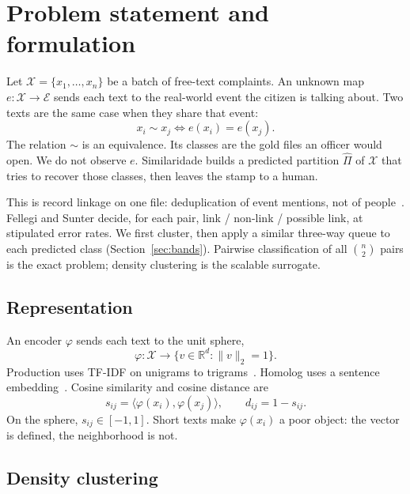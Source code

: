 \documentclass[acmlarge,screen]{acmart}
\begin{document}
\section{Problem statement and formulation}

Let \(\mathcal{X}=\{x_1,\ldots,x_n\}\) be a batch of free-text complaints. An unknown map \(e:\mathcal{X}\to\mathcal{E}\) sends each text to the real-world event the citizen is talking about. Two texts are the same case when they share that event:
\begin{equation}
  x_i \sim x_j \iff e(x_i)=e(x_j).
  \label{eq:same}
\end{equation}
The relation \(\sim\) is an equivalence. Its classes are the gold files an officer would open. We do not observe \(e\). Similaridade builds a predicted partition \(\widehat{\Pi}\) of \(\mathcal{X}\) that tries to recover those classes, then leaves the stamp to a human.

This is record linkage on one file: deduplication of event mentions, not of people~\cite{fellegi1969linkage,elmagarmid2007duplicate}. Fellegi and Sunter decide, for each pair, link / non-link / possible link, at stipulated error rates. We first cluster, then apply a similar three-way queue to each predicted class (Section~\ref{sec:bands}). Pairwise classification of all \(\binom{n}{2}\) pairs is the exact problem; density clustering is the scalable surrogate.

\subsection{Representation}

An encoder \(\varphi\) sends each text to the unit sphere,
\begin{equation}
  \varphi:\mathcal{X}\to\{v\in\mathbb{R}^{d}:\lVert v\rVert_2=1\}.
\end{equation}
Production uses TF-IDF on unigrams to trigrams~\cite{salton1988term}. Homolog uses a sentence embedding~\cite{reimers2019sbert}. Cosine similarity and cosine distance are
\begin{equation}
  s_{ij}=\langle\varphi(x_i),\varphi(x_j)\rangle,\qquad
  d_{ij}=1-s_{ij}.
  \label{eq:cosine}
\end{equation}
On the sphere, \(s_{ij}\in[-1,1]\). Short texts make \(\varphi(x_i)\) a poor object: the vector is defined, the neighborhood is not.

\subsection{Density clustering}
\end{document}
